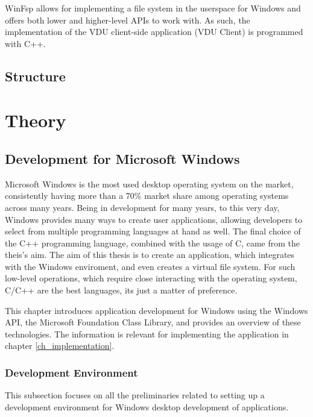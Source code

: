 WinFsp\cite{WinFsp} allows for implementing a file system in the userspace for Windows and offers both lower and higher-level APIs to work with. As such, the implementation of the VDU client-side application (VDU Client) is programmed with C++. 

\section{Structure}

\chapter{Theory}
\label{ch_theory}

\section{Development for Microsoft Windows}
Microsoft Windows is the most used desktop operating system on the market, consistently having more than a 70\% market share among operating systems across many years.\cite{DesktopOSStats} Being in development for many years, to this very day, Windows provides many ways to create user applications, allowing developers to select from multiple programming languages at hand as well. The final choice of the C++ programming language, combined with the usage of C, came from the theis's aim. The aim of this thesis is to create an application, which integrates with the Windows enviroment, and even creates a virtual file system. For such low-level operations, which require close interacting with the operating system, C/C++ are the best languages, its just a matter of preference.

This chapter introduces application development for Windows using the Windows API, the Microsoft Foundation Class Library, and provides an overview of these technologies. The information is relevant for implementing the application in chapter \ref{ch_implementation}.

\subsection{Development Environment}
This subsection focuses on all the preliminaries related to setting up a development environment for Windows desktop development of applications.

